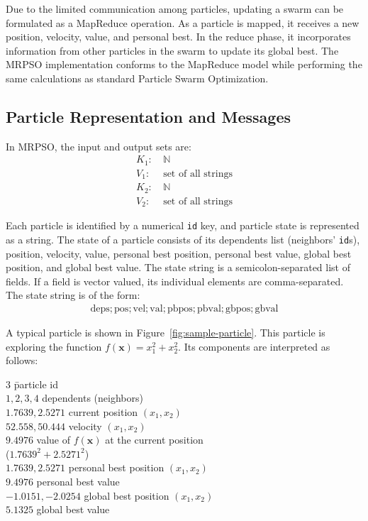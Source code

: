 \documentclass[letterpaper]{sig-alternate}
\renewcommand{\Vec}[1]{\mathbf{#1}}
\providecommand{\NaturalSet}{\ensuremath{\mathbb{N}}}
\providecommand{\InputKeySet}{\ensuremath{K_1}}
\providecommand{\OutputKeySet}{\ensuremath{K_2}}
\providecommand{\InputValSet}{\ensuremath{V_1}}
\providecommand{\OutputValSet}{\ensuremath{V_2}}
\begin{document}
Due to the limited communication among particles, updating a swarm can be
formulated as a MapReduce operation.  As a particle is mapped, it receives a
new position, velocity, value, and personal best.  In the reduce phase, it
incorporates information from other particles in the swarm to update its
global best.  The MRPSO implementation conforms to the MapReduce model while
performing the same calculations as standard Particle Swarm Optimization.

\subsection{Particle Representation and Messages}

In MRPSO, the input and output sets are:
\begin{align}
\InputKeySet:\: &\NaturalSet
\label{eq:pso-inputkey}
\\
\InputValSet:\: & \text{set of all strings}
\label{eq:pso-inputval}
\\
\OutputKeySet:\: &\NaturalSet
\label{eq:pso-outputkey}
\\
\OutputValSet:\: &\text{set of all strings}
\label{eq:pso-outputval}
\end{align}

Each particle is identified by a numerical \verb$id$ key, and particle state
is represented as a string.  The state of a particle consists of its
dependents list (neighbors' \verb$id$s), position, velocity, value, personal
best position, personal best value, global best position, and global best
value.  The state string is a semicolon-separated list of fields.  If a field
is vector valued, its individual elements are comma-separated.  The state
string is of the form:
\begin{align*}
\text{deps};\text{pos};\text{vel};\text{val};\text{pbpos};\text{pbval};\text{gbpos};\text{gbval}
\end{align*}

A typical particle is shown in Figure~\ref{fig:sample-particle}.  This
particle is exploring the function $f(\Vec{x}) = x_1^2 + x_2^2$.  Its
components are interpreted as follows:

\begin{tabbing}
$3$ \hspace{72pt} \= particle id \\
$1,2,3,4$ \> dependents (neighbors) \\
$1.7639,2.5271$ \> current position $(x_1, x_2)$ \\
$52.558,50.444$ \> velocity $(x_1, x_2)$ \\
$9.4976$ \> value of $f(\Vec{x})$ at the current position \\
\> \hspace{16pt} ($1.7639^2 + 2.5271^2$) \\
$1.7639,2.5271$ \> personal best position $(x_1, x_2)$ \\
$9.4976$ \> personal best value \\
$-1.0151,-2.0254$ \> global best position $(x_1, x_2)$ \\
$5.1325$ \> global best value \\
\end{tabbing}
\end{document}
